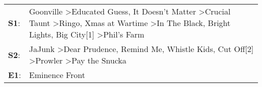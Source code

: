 \begin{supertabular}{p{0.03\textwidth}p{0.92\textwidth}}
 \textbf{S1}:  &  Goonville\textsuperscript{} \textgreater \enspace Educated Guess\textsuperscript{}, \enspace It Doesn't Matter\textsuperscript{} \textgreater \enspace Crucial Taunt\textsuperscript{} \textgreater \enspace Ringo\textsuperscript{}, \enspace Xmas at Wartime\textsuperscript{} \textgreater \enspace In The Black\textsuperscript{}, \enspace Bright Lights, Big City[1]\textsuperscript{} \textgreater \enspace Phil's Farm\textsuperscript{}  \enspace  \\
 \textbf{S2}:  &                                                                                                                                       JaJunk\textsuperscript{} \textgreater \enspace Dear Prudence\textsuperscript{}, \enspace Remind Me\textsuperscript{}, \enspace Whistle Kids\textsuperscript{}, \enspace Cut Off[2]\textsuperscript{} \textgreater \enspace Prowler\textsuperscript{} \textgreater \enspace Pay the Snucka\textsuperscript{}  \enspace  \\
 \textbf{E1}:  &                                                                                                                                                                                                                                                                                                                                                                                                                  Eminence Front\textsuperscript{}  \enspace  \\
\end{supertabular}
